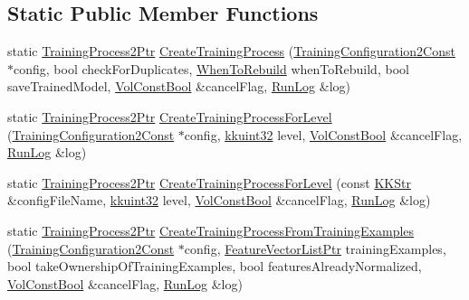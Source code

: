 \subsection*{Static Public Member Functions}
\begin{DoxyCompactItemize}
\item 
static \hyperlink{class_k_k_m_l_l_1_1_training_process2_a5442e76e1ae2de2e77e3a36b55f98fe4}{Training\+Process2\+Ptr} \hyperlink{class_k_k_m_l_l_1_1_training_process2_a1c2561c1c6d62c5bb02aa7f061fad48f}{Create\+Training\+Process} (\hyperlink{namespace_k_k_m_l_l_abec6237fd9c0112ff72b75b10d4b5696}{Training\+Configuration2\+Const} $\ast$config, bool check\+For\+Duplicates, \hyperlink{class_k_k_m_l_l_1_1_training_process2_acc48e76f6978c8c8c0c849eec2d0ee53}{When\+To\+Rebuild} when\+To\+Rebuild, bool save\+Trained\+Model, \hyperlink{namespace_k_k_b_a7d390f568e2831fb76b86b56c87bf92f}{Vol\+Const\+Bool} \&cancel\+Flag, \hyperlink{class_k_k_b_1_1_run_log}{Run\+Log} \&log)
\item 
static \hyperlink{class_k_k_m_l_l_1_1_training_process2_a5442e76e1ae2de2e77e3a36b55f98fe4}{Training\+Process2\+Ptr} \hyperlink{class_k_k_m_l_l_1_1_training_process2_a05fe273353d938fc7c31b9470bebce51}{Create\+Training\+Process\+For\+Level} (\hyperlink{namespace_k_k_m_l_l_abec6237fd9c0112ff72b75b10d4b5696}{Training\+Configuration2\+Const} $\ast$config, \hyperlink{namespace_k_k_b_af8d832f05c54994a1cce25bd5743e19a}{kkuint32} level, \hyperlink{namespace_k_k_b_a7d390f568e2831fb76b86b56c87bf92f}{Vol\+Const\+Bool} \&cancel\+Flag, \hyperlink{class_k_k_b_1_1_run_log}{Run\+Log} \&log)
\item 
static \hyperlink{class_k_k_m_l_l_1_1_training_process2_a5442e76e1ae2de2e77e3a36b55f98fe4}{Training\+Process2\+Ptr} \hyperlink{class_k_k_m_l_l_1_1_training_process2_a568386096263a39a5cb9166b0f11ba85}{Create\+Training\+Process\+For\+Level} (const \hyperlink{class_k_k_b_1_1_k_k_str}{K\+K\+Str} \&config\+File\+Name, \hyperlink{namespace_k_k_b_af8d832f05c54994a1cce25bd5743e19a}{kkuint32} level, \hyperlink{namespace_k_k_b_a7d390f568e2831fb76b86b56c87bf92f}{Vol\+Const\+Bool} \&cancel\+Flag, \hyperlink{class_k_k_b_1_1_run_log}{Run\+Log} \&log)
\item 
static \hyperlink{class_k_k_m_l_l_1_1_training_process2_a5442e76e1ae2de2e77e3a36b55f98fe4}{Training\+Process2\+Ptr} \hyperlink{class_k_k_m_l_l_1_1_training_process2_a08ee13d20cc134bca051cf7daf2a0c45}{Create\+Training\+Process\+From\+Training\+Examples} (\hyperlink{namespace_k_k_m_l_l_abec6237fd9c0112ff72b75b10d4b5696}{Training\+Configuration2\+Const} $\ast$config, \hyperlink{namespace_k_k_m_l_l_acf2ba92a3cf03e2b19674b24ff488ef6}{Feature\+Vector\+List\+Ptr} training\+Examples, bool take\+Ownership\+Of\+Training\+Examples, bool features\+Already\+Normalized, \hyperlink{namespace_k_k_b_a7d390f568e2831fb76b86b56c87bf92f}{Vol\+Const\+Bool} \&cancel\+Flag, \hyperlink{class_k_k_b_1_1_run_log}{Run\+Log} \&log)

\end{DoxyCompactItemize}
